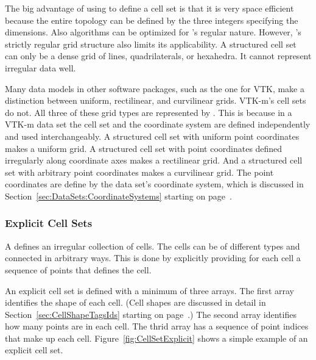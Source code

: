 The big advantage of using  to define a cell
set is that it is very space efficient because the entire topology can be
defined by the three integers specifying the dimensions. Also algorithms
can be optimized for 's regular nature.
However, 's strictly regular grid
structure also limits its applicability. A structured cell set can only be
a dense grid of lines, quadrilaterals, or hexahedra. It cannot represent
irregular data well.

Many data models in other software packages, such as the one for VTK, make
a distinction between uniform, rectilinear, and curvilinear grids. VTK-m's
cell sets do not. All three of these grid types are represented by
. This is because in a VTK-m data set the
cell set and the coordinate system are defined independently and used
interchangeably. A structured cell set with uniform point coordinates makes
a uniform grid. A structured cell set with point coordinates defined
irregularly along coordinate axes makes a rectilinear grid. And a
structured cell set with arbitrary point coordinates makes a curvilinear
grid. The point coordinates are define by the data set's coordinate system,
which is discussed in Section~\ref{sec:DataSets:CoordinateSystems} starting
on page~\pageref{sec:DataSets:CoordinateSystems}.


\subsubsection{Explicit Cell Sets}


A  defines an irregular collection of cells. The
cells can be of different types and connected in arbitrary ways. This is
done by explicitly providing for each cell a sequence of points that
defines the cell.

An explicit cell set is defined with a minimum of three arrays. The first
array identifies the shape of each cell. (Cell shapes are discussed in
detail in Section~\ref{sec:CellShapeTagsIds} starting on
page~\pageref{sec:CellShapeTagsIds}.) The second array identifies how many
points are in each cell. The thrid array has a sequence of point indices
that make up each cell. Figure~\ref{fig:CellSetExplicit} shows a simple
example of an explicit cell set.

